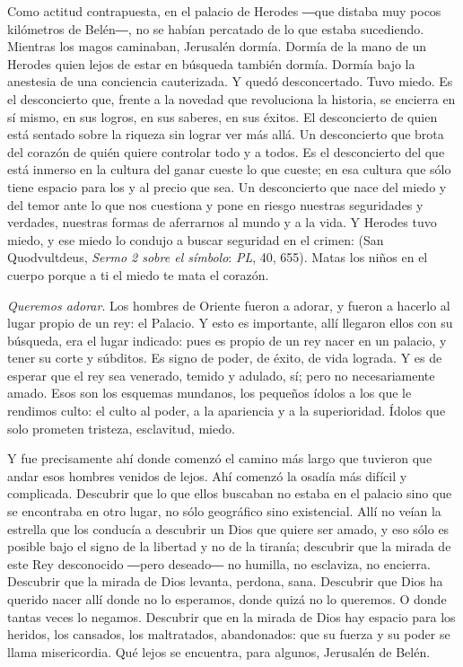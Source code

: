 {Como actitud contrapuesta, en el palacio de Herodes ―que distaba muy pocos kilómetros de Belén―, no se habían percatado de lo que estaba sucediendo. Mientras los magos caminaban, Jerusalén dormía. Dormía de la mano de un Herodes quien lejos de estar en búsqueda también dormía. Dormía bajo la anestesia de una conciencia cauterizada. Y quedó desconcertado. Tuvo miedo. Es el desconcierto que, frente a la novedad que revoluciona la historia, se encierra en sí mismo, en sus logros, en sus saberes, en sus éxitos. El desconcierto de quien está sentado sobre la riqueza sin lograr ver más allá. Un desconcierto que brota del corazón de quién quiere controlar todo y a todos. Es el desconcierto del que está inmerso en la cultura del ganar cueste lo que cueste; en esa cultura que sólo tiene espacio para los  y al precio que sea. Un desconcierto que nace del miedo y del temor ante lo que nos cuestiona y pone en riesgo nuestras seguridades y verdades, nuestras formas de aferrarnos al mundo y a la vida. Y Herodes tuvo miedo, y ese miedo lo condujo a buscar seguridad en el crimen:  (San Quodvultdeus, \emph{Sermo 2 sobre el símbolo}: \emph{PL}, 40, 655). Matas los niños en el cuerpo porque a ti el miedo te mata el corazón.

\emph{Queremos adorar}. Los hombres de Oriente fueron a adorar, y fueron a hacerlo al lugar propio de un rey: el Palacio. Y esto es importante, allí llegaron ellos con su búsqueda, era el lugar indicado: pues es propio de un rey nacer en un palacio, y tener su corte y súbditos. Es signo de poder, de éxito, de vida lograda. Y es de esperar que el rey sea venerado, temido y adulado, sí; pero no necesariamente amado. Esos son los esquemas mundanos, los pequeños ídolos a los que le rendimos culto: el culto al poder, a la apariencia y a la superioridad. Ídolos que solo prometen tristeza, esclavitud, miedo.

Y fue precisamente ahí donde comenzó el camino más largo que tuvieron que andar esos hombres venidos de lejos. Ahí comenzó la osadía más difícil y complicada. Descubrir que lo que ellos buscaban no estaba en el palacio sino que se encontraba en otro lugar, no sólo geográfico sino existencial. Allí no veían la estrella que los conducía a descubrir un Dios que quiere ser amado, y eso sólo es posible bajo el signo de la libertad y no de la tiranía; descubrir que la mirada de este Rey desconocido ―pero deseado― no humilla, no esclaviza, no encierra. Descubrir que la mirada de Dios levanta, perdona, sana. Descubrir que Dios ha querido nacer allí donde no lo esperamos, donde quizá no lo queremos. O donde tantas veces lo negamos. Descubrir que en la mirada de Dios hay espacio para los heridos, los cansados, los maltratados, abandonados: que su fuerza y su poder se llama misericordia. Qué lejos se encuentra, para algunos, Jerusalén de Belén.

}

